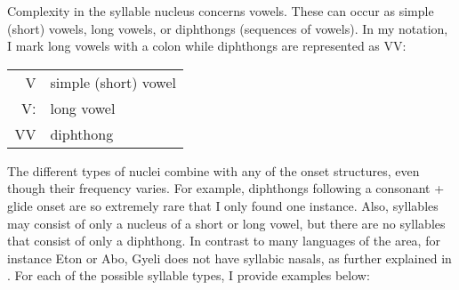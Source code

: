 \noindent Complexity in the syllable nucleus concerns vowels. These can occur as simple (short) vowels, long vowels, or diphthongs (sequences of vowels). In my notation, I mark long vowels with a colon while diphthongs are represented as VV:

\begin{center}
\begin{tabular}{rl}
V & simple (short) vowel \\ \
Vː & long vowel \\
VV & diphthong \\ 
\end{tabular}
\end{center}

\noindent The different types of nuclei combine with any of the onset structures, even though their frequency varies. For example, diphthongs following a consonant + glide onset are so extremely rare that I only found one instance. Also, syllables may consist of only a nucleus of a short or long vowel, but there are no syllables that consist of only a diphthong. In contrast to many languages of the area, for instance Eton or Abo, Gyeli does not have syllabic nasals, as further explained in . For each of the possible syllable types, I provide examples below: 



